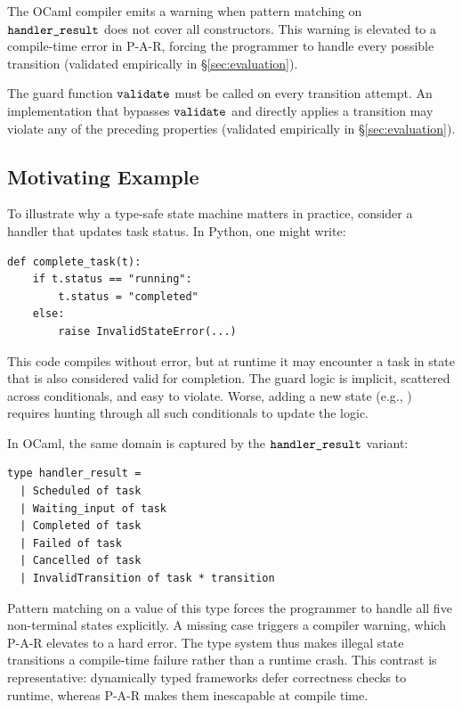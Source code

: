 \begin{prop}[Exhaustiveness]\label{prop:exhaustiveness}
The OCaml compiler emits a warning when pattern matching on $\identifiable{handler\_result}$ does not cover all constructors. This warning is elevated to a compile-time error in P-A-R, forcing the programmer to handle every possible transition (validated empirically in \S\ref{sec:evaluation}).
\end{prop}

\begin{prop}\label{prop:semantic-validity}
The guard function $\identifiable{validate}$ must be called on every transition attempt. An implementation that bypasses $\identifiable{validate}$ and directly applies a transition may violate any of the preceding properties (validated empirically in \S\ref{sec:evaluation}).
\end{prop}

\subsection{Motivating Example}\label{sec:motivating-example}

To illustrate why a type-safe state machine matters in practice, consider a handler that updates task status. In Python, one might write:

\begin{verbatim}
def complete_task(t):
    if t.status == "running":
        t.status = "completed"
    else:
        raise InvalidStateError(...)
\end{verbatim}

This code compiles without error, but at runtime it may encounter a task in state  that is also considered valid for completion. The guard logic is implicit, scattered across conditionals, and easy to violate. Worse, adding a new state (e.g., ) requires hunting through all such conditionals to update the logic.

In OCaml, the same domain is captured by the $\identifiable{handler\_result}$ variant:

\begin{verbatim}
type handler_result =
  | Scheduled of task
  | Waiting_input of task
  | Completed of task
  | Failed of task
  | Cancelled of task
  | InvalidTransition of task * transition
\end{verbatim}

Pattern matching on a value of this type forces the programmer to handle all five non-terminal states explicitly. A missing case triggers a compiler warning, which P-A-R elevates to a hard error. The type system thus makes illegal state transitions a compile-time failure rather than a runtime crash. This contrast is representative: dynamically typed frameworks defer correctness checks to runtime, whereas P-A-R makes them inescapable at compile time.